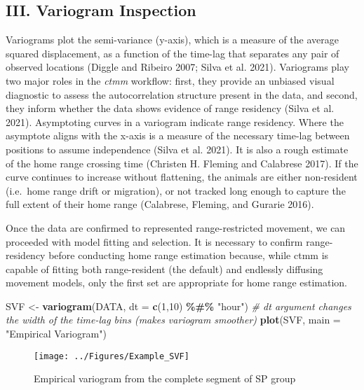 \documentclass[
]{article}
\newenvironment{Shaded}{\begin{snugshade}}{\end{snugshade}}
\newcommand{\AttributeTok}[1]{\textcolor[rgb]{0.13,0.29,0.53}{#1}}
\newcommand{\CommentTok}[1]{\textcolor[rgb]{0.56,0.35,0.01}{\textit{#1}}}
\newcommand{\DecValTok}[1]{\textcolor[rgb]{0.00,0.00,0.81}{#1}}
\newcommand{\FunctionTok}[1]{\textcolor[rgb]{0.13,0.29,0.53}{\textbf{#1}}}
\newcommand{\NormalTok}[1]{#1}
\newcommand{\OtherTok}[1]{\textcolor[rgb]{0.56,0.35,0.01}{#1}}
\newcommand{\SpecialCharTok}[1]{\textcolor[rgb]{0.81,0.36,0.00}{\textbf{#1}}}
\newcommand{\StringTok}[1]{\textcolor[rgb]{0.31,0.60,0.02}{#1}}
\begin{document}
\subsection{III. Variogram Inspection}\label{iii.-variogram-inspection}

Variograms plot the semi-variance (y-axis), which is a measure of the
average squared displacement, as a function of the time-lag that
separates any pair of observed locations (Diggle and Ribeiro 2007; Silva
et al. 2021). Variograms play two major roles in the \emph{ctmm}
workflow: first, they provide an unbiased visual diagnostic to assess
the autocorrelation structure present in the data, and second, they
inform whether the data shows evidence of range residency (Silva et al.
2021). Asymptoting curves in a variogram indicate range residency. Where
the asymptote aligns with the x-axis is a measure of the necessary
time-lag between positions to assume independence (Silva et al. 2021).
It is also a rough estimate of the home range crossing time (Christen H.
Fleming and Calabrese 2017). If the curve continues to increase without
flattening, the animals are either non-resident (i.e.~home range drift
or migration), or not tracked long enough to capture the full extent of
their home range (Calabrese, Fleming, and Gurarie 2016).

Once the data are confirmed to represented range-restricted movement, we
can proceeded with model fitting and selection. It is necessary to
confirm range-residency before conducting home range estimation because,
while ctmm is capable of fitting both range-resident (the default) and
endlessly diffusing movement models, only the first set are appropriate
for home range estimation.

\begin{Shaded}
\begin{Highlighting}[]
\NormalTok{SVF }\OtherTok{\textless{}{-}} \FunctionTok{variogram}\NormalTok{(DATA, }\AttributeTok{dt =} \FunctionTok{c}\NormalTok{(}\DecValTok{1}\NormalTok{,}\DecValTok{10}\NormalTok{) }\SpecialCharTok{\%\#\%} \StringTok{"hour"}\NormalTok{) }\CommentTok{\# dt argument changes the width of the time{-}lag bins (makes variogram smoother)}
\FunctionTok{plot}\NormalTok{(SVF, }\AttributeTok{main =} \StringTok{"Empirical Variogram"}\NormalTok{)}
\end{Highlighting}
\end{Shaded}

\begin{figure}[H]

{\centering \texttt{[image: ../Figures/Example\_SVF]} 

}

\caption{Empirical variogram from the complete segment of SP group}\label{fig:unnamed-chunk-13}
\end{figure}
\end{document}
